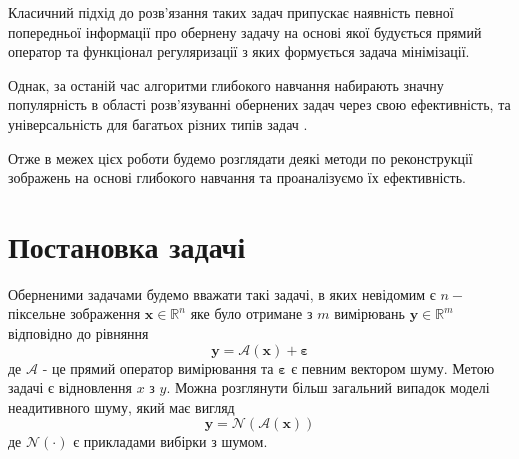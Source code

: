 \documentclass[14pt,a4paper]{extarticle}
\newcounter{e}
\numberwithin{equation}{section}
\numberwithin{figure}{section}
\begin{document}
	Класичний підхід до розв'язання таких задач припускає наявність певної попередньої інформації про обернену задачу на основі якої будується прямий оператор та функціонал регуляризації з яких формується задача мінімізації.
		
	Однак, за останій час алгоритми глибокого навчання набирають значну популярність в області розв'язуванні обернених задач через свою ефективність, та універсальність для багатьох різних типів задач \cite{ongie2020deep}. 
	
	Отже в межех цієх роботи будемо розглядати деякі методи по реконструкції зображень на основі глибокого навчання та проаналізуємо їх ефективність.
	
	\newpage
	\thispagestyle{empty}
	\section{Постановка задачі} 
	
	

	
	
	
	
	Оберненими задачами будемо вважати такі задачі, в яких невідомим є $n-$ піксельне зображення $\boldsymbol{x} \in \mathbb{R}^{n}$ яке було отримане з $m$ вимірювань $\boldsymbol{y} \in \mathbb{R}^{m}$ відповідно до рівняння
	\begin{equation}
	\label{forward-problem}
	\boldsymbol{y}=\mathcal{A}\left(\boldsymbol{x}\right)+\boldsymbol{\varepsilon}
	\end{equation}
	де $\mathcal{A}$ - це прямий оператор вимірювання та $\boldsymbol{\varepsilon}$ є певним вектором шуму. Метою задачі є відновлення $x$ з $y$. Можна розглянути більш загальний випадок моделі неадитивного шуму, який має вигляд 
	\begin{equation}
	\label{forward-problem-non-additive}
	\boldsymbol{y}=\mathcal{N}\left(\mathcal{A}\left(\boldsymbol{x}\right)\right)
	\end{equation}
	де $\mathcal{N}(\cdot)$ є прикладами вибірки з шумом.
\end{document}
